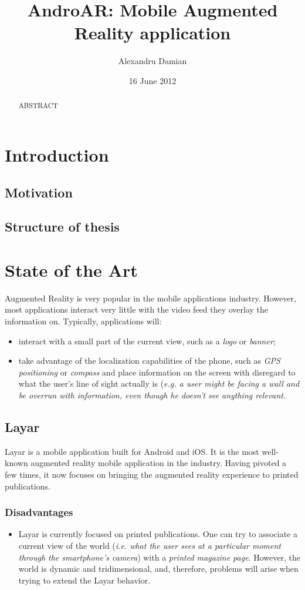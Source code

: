 \documentclass[a4paper,onecolumn,oneside,titlepage,12pt]{report}
\title{AndroAR: Mobile Augmented Reality application}
\author{Alexandru Damian}
\date{16 June 2012}
\begin{document}
\maketitle
\begin{abstract}
ABSTRACT
\end{abstract}
\tableofcontents

\chapter{Introduction}
\section{Motivation}
\section{Structure of thesis}

\chapter{State of the Art}
Augmented Reality is very popular in the mobile applications industry. However, most applications interact very little with the video feed they overlay the information on. Typically, applications will:
\begin{itemize}
	\item interact with a small part of the current view, such as a \emph{logo} or \emph{banner};
	\item take advantage of the localization capabilities of the phone, such as \emph{GPS positioning} or \emph{compass} and place information on the screen with disregard to what the user's line of sight actually is (\emph{e.g. a user might be facing a wall and be overrun with information, even though he doesn't see anything relevant}.
\end{itemize}
\section{Layar}
Layar is a mobile application built for Android and iOS. It is the most well-known augmented reality mobile application in the industry. Having pivoted a few times, it now focuses on bringing the augmented reality experience to printed publications.
\subsection*{Disadvantages}
\begin{itemize}
	\item Layar is currently focused on printed publications. One can try to associate a current view of the world (\emph{i.e. what the user sees at a particular moment through the smartphone's camera}) with a \emph{printed magazine page}. However, the world is dynamic and tridimensional, and, therefore, problems will arise when trying to extend the Layar behavior.
\end{itemize}
\end{document}
